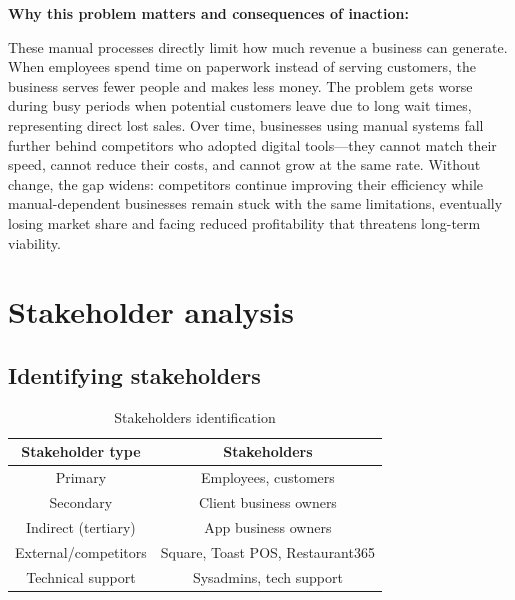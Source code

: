 \documentclass[]{VUMIFTemplateClass}
\begin{document}
\textbf{Why this problem matters and consequences of inaction:}

These manual processes directly limit how much revenue a business can generate.
When employees spend time on paperwork instead of serving customers, the
business serves fewer people and makes less money. The problem gets worse
during busy periods when potential customers leave due to long wait times,
representing direct lost sales. Over time, businesses using manual systems
fall further behind competitors who adopted digital tools—they cannot match
their speed, cannot reduce their costs, and cannot grow at the same rate.
Without change, the gap widens: competitors continue improving their
efficiency while manual-dependent businesses remain stuck with the same
limitations, eventually losing market share and facing reduced profitability
that threatens long-term viability.


\section{Stakeholder analysis}

\subsection{Identifying stakeholders}

\begin{table}[h]
  \centering
  \caption{Stakeholders identification}
  \begin{tabular}{|c|c|}
    \hline
    Stakeholder type    & Stakeholders \\ \hline
    Primary             & Employees, customers \\ \hline
    Secondary           & Client business owners \\ \hline
    Indirect (tertiary) & App business owners \\ \hline
    External/competitors & Square, Toast POS, Restaurant365 \\ \hline
    Technical support   & Sysadmins, tech support \\ \hline
  \end{tabular}
  \label{tab:stakeholders}
\end{table}

\end{document}
